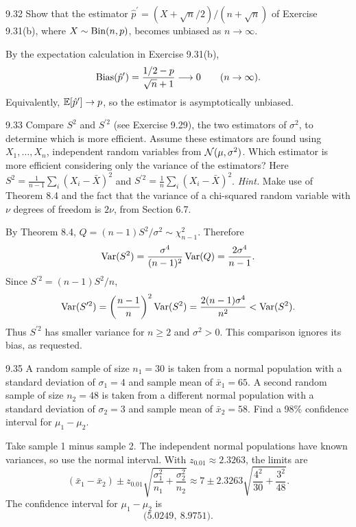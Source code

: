 \documentclass[11pt,oneside]{article}
\begin{document}
\begin{exercise}{9.32}
Show that the estimator $\hat p^{\prime}=(X+\sqrt n/2)/(n+\sqrt n)$ of Exercise 9.31(b), where $X\sim\operatorname{Bin}(n,p)$, becomes unbiased as $n\to\infty$.
\end{exercise}
\begin{solution}
By the expectation calculation in Exercise 9.31(b),
\[
\operatorname{Bias}(\hat p^{\prime})=\frac{1/2-p}{\sqrt n+1}\longrightarrow0\qquad(n\to\infty).
\]
Equivalently, $\mathbb{E}[\hat p^{\prime}]\to p$, so the estimator is asymptotically unbiased.
\end{solution}

\begin{exercise}{9.33}
Compare $S^2$ and $S^{\prime 2}$ (see Exercise 9.29), the two estimators of $\sigma^2$, to determine which is more efficient. Assume these estimators are found using $X_1,\ldots,X_n$, independent random variables from $\mathcal{N}(\mu,\sigma^2)$. Which estimator is more efficient considering only the variance of the estimators? Here $S^2=\frac1{n-1}\sum_i(X_i-\bar X)^2$ and $S^{\prime 2}=\frac1n\sum_i(X_i-\bar X)^2$. \textit{Hint.} Make use of Theorem 8.4 and the fact that the variance of a chi-squared random variable with $\nu$ degrees of freedom is $2\nu$, from Section 6.7.
\end{exercise}
\begin{solution}
By Theorem 8.4, $Q=(n-1)S^2/\sigma^2\sim\chi^2_{n-1}$. Therefore
\[
\operatorname{Var}(S^2)=\frac{\sigma^4}{(n-1)^2}\operatorname{Var}(Q)=\frac{2\sigma^4}{n-1}.
\]
Since $S^{\prime 2}=(n-1)S^2/n$,
\[
\operatorname{Var}(S^{\prime 2})=\left(\frac{n-1}{n}\right)^2\operatorname{Var}(S^2)=\frac{2(n-1)\sigma^4}{n^2}<\operatorname{Var}(S^2).
\]
Thus $S^{\prime 2}$ has smaller variance for $n\ge2$ and $\sigma^2>0$. This comparison ignores its bias, as requested.
\end{solution}

\begin{exercise}{9.35}
A random sample of size $n_1=30$ is taken from a normal population with a standard deviation of $\sigma_1=4$ and sample mean of $\bar x_1=65$. A second random sample of size $n_2=48$ is taken from a different normal population with a standard deviation of $\sigma_2=3$ and sample mean of $\bar x_2=58$. Find a 98\% confidence interval for $\mu_1-\mu_2$.
\end{exercise}
\begin{solution}
Take sample 1 minus sample 2. The independent normal populations have known variances, so use the normal interval. With $z_{0.01}\approx2.3263$, the limits are
\[
(\bar x_1-\bar x_2)\pm z_{0.01}\sqrt{\frac{\sigma_1^2}{n_1}+\frac{\sigma_2^2}{n_2}}\approx 7\pm 2.3263\sqrt{\frac{4^2}{30}+\frac{3^2}{48}}.
\]
The confidence interval for $\mu_1-\mu_2$ is 
\[
\boxed{\bigl(5.0249,\ 8.9751\bigr)}.
\]
\end{solution}
\end{document}
